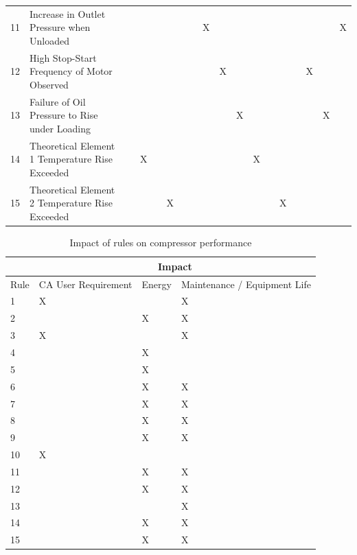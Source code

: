 \begin{table}[htbp]
\begin{tabular}{r|l|r|r|r|r|r|r|r|r|r|r|r|r|r|r|r|r}
    11    & Increase in Outlet Pressure when Unloaded &       &       &       &       &       &       & X     &       &       &       &       &       &       &       &       & X \\
    12    & High Stop-Start Frequency of Motor Observed &       &       &       &       &       &       &       & X     &       &       &       &       &       & X     &       &  \\
    13    & Failure of Oil Pressure to Rise under Loading &       &       &       &       &       &       &       &       & X     &       &       &       &       &       & X     &  \\
    14    & Theoretical Element 1 Temperature Rise Exceeded &       & X     &       &       &       &       &       &       &       & X     &       &       &       &       &       &  \\
    15    & Theoretical Element 2 Temperature Rise Exceeded &       &       &       & X     &       &       &       &       &       &       &       & X     &       &       &       &  \\
    \bottomrule
    \end{tabular}%
  \label{tab:ruleset}%
\end{table}%

\begin{table}[htbp]
  \centering
  \caption{Impact of rules on compressor performance}
    \begin{tabular}{p{}p{}p{}p{}}
    \toprule
          & \multicolumn{3}{c}{Impact} \\
    \midrule
    Rule  & CA User Requirement & Energy & Maintenance / Equipment Life \\
    1     & X     &       & X \\
    2     &       & X     & X \\
    3     & X     &       & X \\
    4     &       & X     &  \\
    5     &       & X     &  \\
    6     &       & X     & X \\
    7     &       & X     & X \\
    8     &       & X     & X \\
    9     &       & X     & X \\
    10    & X     &       &  \\
    11    &       & X     & X \\
    12    &       & X     & X \\
    13    &       &       & X \\
    14    &       & X     & X \\
    15    &       & X     & X \\
    \bottomrule
    \end{tabular}%
  \label{tab:ruleimpact}%
\end{table}%

